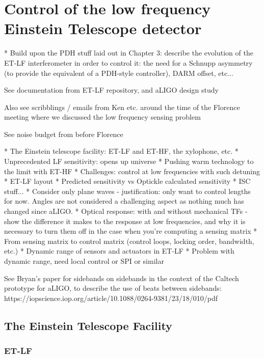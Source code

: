 \chapter{Control of the low frequency Einstein Telescope detector}
\label{c:et-lf-control}

  * Build upon the PDH stuff laid out in Chapter 3: describe the evolution of the ET-LF interferometer in order to control it: the need for a Schnupp asymmetry (to provide the equivalent of a PDH-style controller), DARM offset, etc...
  
  See documentation from ET-LF repository, and aLIGO design study
  
  Also see scribblings / emails from Ken etc. around the time of the Florence meeting where we discussed the low frequency sensing problem
  
  See noise budget from before Florence

  * The Einstein telescope facility: ET-LF and ET-HF, the xylophone, etc.
    * Unprecedented LF sensitivity: opens up universe
    * Pushing warm technology to the limit with ET-HF
    * Challenges: control at low frequencies with such detuning
  * ET-LF layout
  * Predicted sensitivity vs Optickle calculated sensitivity
  * ISC stuff...
    * Consider only plane waves - justification: only want to control lengths for now. Angles are not considered a challenging aspect as nothing much has changed since aLIGO.
    * Optical response: with and without mechanical TFs - show the difference it makes to the response at low frequencies, and why it is necessary to turn them off in the case when you're computing a sensing matrix
    * From sensing matrix to control matrix (control loops, locking order, bandwidth, etc.)
    * Dynamic range of sensors and actuators in ET-LF
      * Problem with dynamic range, need local control or SPI or similar
  
  See Bryan's paper for sidebands on sidebands in the context of the Caltech prototype for aLIGO, to describe the use of beats between sidebands: https://iopscience.iop.org/article/10.1088/0264-9381/23/18/010/pdf

\section{The Einstein Telescope Facility}

\subsection{ET-LF}


